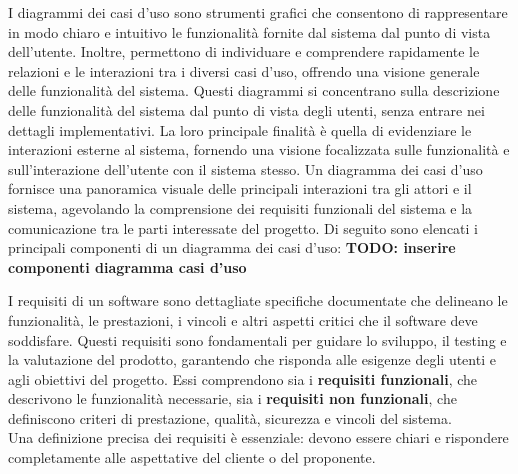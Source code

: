 I diagrammi dei casi d'uso sono strumenti grafici che consentono di rappresentare in modo chiaro e intuitivo le funzionalità fornite dal sistema dal punto di vista dell'utente. Inoltre, permettono di individuare e comprendere rapidamente le relazioni e le interazioni tra i diversi casi d'uso, offrendo una visione generale delle funzionalità del sistema.
Questi diagrammi si concentrano sulla descrizione delle funzionalità del sistema dal punto di vista degli utenti, senza entrare nei dettagli implementativi. La loro principale finalità è quella di evidenziare le interazioni esterne al sistema, fornendo una visione focalizzata sulle funzionalità e sull'interazione dell'utente con il sistema stesso.
Un diagramma dei casi d'uso fornisce una panoramica visuale delle principali interazioni tra gli attori e il sistema, agevolando la comprensione dei requisiti funzionali del sistema e la comunicazione tra le parti interessate del progetto.
Di seguito sono elencati i principali componenti di un diagramma dei casi d'uso:
\textbf{TODO: inserire componenti diagramma casi d'uso}

I requisiti di un software sono dettagliate specifiche documentate che delineano le funzionalità, le prestazioni, i vincoli e altri aspetti critici che il software deve soddisfare. Questi requisiti sono fondamentali per guidare lo sviluppo, il testing e la valutazione del prodotto, garantendo che risponda alle esigenze degli utenti e agli obiettivi del progetto. Essi comprendono sia i \textbf{requisiti funzionali}, che descrivono le funzionalità necessarie, sia i \textbf{requisiti non funzionali}, che definiscono criteri di prestazione, qualità, sicurezza e vincoli del sistema.\\
Una definizione precisa dei requisiti è essenziale: devono essere chiari e rispondere completamente alle aspettative del cliente o del proponente.

